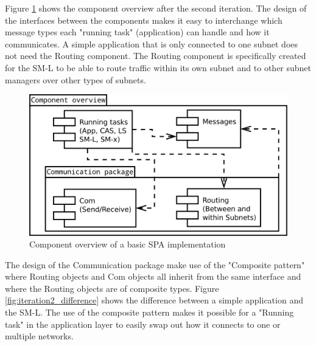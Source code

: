 Figure \ref{fig:iteration2_uml_component_overview} shows the component overview
after the second iteration. The design of the interfaces between the components
makes it easy to interchange which message types each "running task"
(application) can handle and how it communicates. A simple application that is
only connected to one subnet does not need the Routing component. The Routing
component is specifically created for the SM-L to be able to route traffic
within its own subnet and to other subnet managers over other types of subnets.

\begin{figure}[h]
    \centering
    \includegraphics[width=\textwidth]{figures/iteration2_uml_component_overview}
    \caption{Component overview of a basic SPA implementation}
    \label{fig:iteration2_uml_component_overview}
\end{figure}

The design of the Communication package make use of the "Composite
pattern" where Routing objects and Com objects all inherit from the same
interface and where the Routing objects are of composite types. Figure
\ref{fig:iteration2_difference} shows the difference between a simple
application and the SM-L. The use of the composite pattern makes it possible
for a "Running task" in the application layer to easily swap out how it
connects to one or multiple networks.

